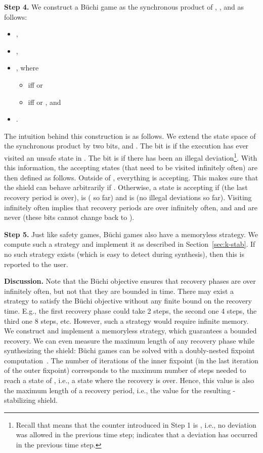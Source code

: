\documentclass{llncs}
\newcommand{\buchi}{B\"uchi\xspace}
\begin{document}
\noindent
\textbf{Step 4.} We construct a \buchi game  as the synchronous product of , , 
 and  as follows: 
\begin{itemize}
\item , 
\item ,
\item ,
where
 \begin{itemize}
 \item  iff  or 
 \item  iff  or , and
 \end{itemize}
\item .
\end{itemize}
The intuition behind this construction is as follows.  We extend the 
state space of the synchronous product by two bits,  and .  The 
bit  is  if the execution has ever visited an unsafe state in 
.  The bit  is  if there has been an illegal 
deviation\footnote{Recall that  means that the counter  
introduced in Step 1 is , i.e., no deviation was allowed in the 
previous time step;  indicates that a deviation has occurred in 
the previous time step.}. With this information, the accepting states 
(that need to be visited infinitely often) are then defined as follows. 
Outside of , everything is accepting.  This makes sure that the 
shield can behave arbitrarily if .  Otherwise, 
a state is accepting if  (the last recovery period is over), 
 is  ( so far) and  is 
 (no illegal deviations so far).  Visiting  infinitely 
often implies that recovery periods are over infinitely often, and  
and  are never  (these bits cannot change back to ).

\noindent
\textbf{Step 5.}  Just like safety games, \buchi games also have a 
memoryless strategy.  We compute such a strategy and implement it as 
described in Section~\ref{sec:k-stab}. If no such strategy exists (which 
is easy to detect during synthesis), then this is reported to the user.

\noindent
\textbf{Discussion.}
Note that the \buchi objective ensures that recovery phases are over 
infinitely often, but not that they are bounded in time.  There may 
exist a strategy to satisfy the \buchi objective without any finite 
bound on the recovery time.  E.g., the first recovery phase could take 2 
steps, the second one 4 steps, the third one 8 steps, etc.  However, 
such a strategy would require infinite memory. We construct and 
implement a memoryless strategy, which guarantees a bounded recovery.  
We can even measure the maximum length of any recovery phase while 
synthesizing the shield: \buchi games can be solved with a doubly-nested 
fixpoint computation~\cite{Mazala01}.  The number of iterations of the 
inner fixpoint (in the last iteration of the outer fixpoint) corresponds 
to the maximum number of steps needed to reach a state of , 
i.e., a state where the recovery is over.  Hence, this value is also the 
maximum length of a recovery period, i.e., the value  for the 
resulting -stabilizing shield.
\fi
\end{document}
